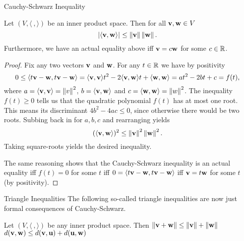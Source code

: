 \begin{frame}{Cauchy-Schwarz Inequality}
\begin{theorem}
Let $(V,\langle \ , \rangle)$ be an inner product space. Then for all ${\mathbf v},{\mathbf w}\in V$ 
\[
\left\lvert \langle{\mathbf v},{\mathbf w}\rangle\right\rvert_{}\leq\left\lVert{\mathbf v}\right\rVert\left\lVert{\mathbf w}\right\rVert.
\]
Furthermore, we have an actual equality above iff ${\mathbf v}=c{\mathbf w}$ for some $c\in{\mathbb R}$. 
\end{theorem}
\pause
\begin{proof}\scriptsize
Fix any two vectors ${\mathbf v}$ and ${\mathbf w}$. For any $t\in{\mathbb R}$ we have by positivity 
\[
0\leq \langle t{\mathbf v}-{\mathbf w},t{\mathbf v}-{\mathbf w}\rangle=\langle{\mathbf v},{\mathbf v}\rangle t^2-2\langle{\mathbf v},{\mathbf w}\rangle t+\langle{\mathbf w},{\mathbf w}\rangle=at^2-2bt+c=f(t),
\]
where $a=\langle{\mathbf v},{\mathbf v}\rangle=\left\lVert v\right\rVert^2$, $b=\langle{\mathbf v},{\mathbf w}\rangle$ and $c=\langle{\mathbf w},{\mathbf w}\rangle=\left\lVert w\right\rVert^2$. 
\bpause
The inequality $f(t)\geq 0$ tells us that the quadratic polynomial $f(t)$ has \alert{at most} one root. This means its discriminant $4b^2-4ac\leq 0$, since otherwise there would be two roots. 
\bpause 
Subbing back in for $a,b,c$ and rearranging yields 
\[
(\langle{\mathbf v},{\mathbf w}\rangle)^2\leq \left\lVert{\mathbf v}\right\rVert^2\left\lVert{\mathbf w}\right\rVert^2.
\]
Taking square-roots yields the desired inequality. 

\pause
The same reasoning shows that the Cauchy-Schwarz inequality is an actual equality iff $f(t)=0$ for some $t$ iff $0=\langle t{\mathbf v}-{\mathbf w},t{\mathbf v}-{\mathbf w}\rangle$ iff ${\mathbf v}=t{\mathbf w}$ for some $t$ (by positivity). 
\end{proof}
\end{frame}
\begin{frame}{Triangle Inequalities}
The following so-called triangle inequalities are now just formal consequences of Cauchy-Schwarz.
\begin{theorem}
Let $(V, \langle \ , \rangle)$ be any inner product space. Then 
\bb
\ii $\left\lVert{\mathbf v}+{\mathbf w}\right\rVert\leq \left\lVert{\mathbf v}\right\rVert+\left\lVert{\mathbf w}\right\rVert$ 
\ii $d({\mathbf v},{\mathbf w})\leq d({\mathbf v},{\mathbf u})+d({\mathbf u},{\mathbf w})$
\ee
\end{theorem}

\end{frame}
